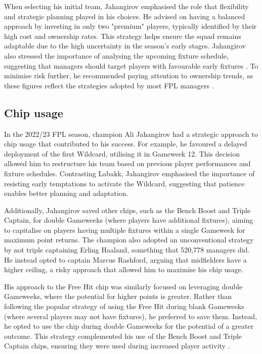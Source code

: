 When selecting his initial team, Jahangirov emphasised the role that flexibility and strategic planning played in his choices. He advised on having a balanced approach by investing in only two "premium" players, typically identified by their high cost and ownership rates. This strategy helps ensure the squad remains adaptable due to the high uncertainty in the season's early stages. Jahangirov also stressed the importance of analysing the upcoming fixture schedule, suggesting that managers should target players with favourable early fixtures \cite{fpl_jahangirov2023}. To minimise risk further, he recommended paying attention to ownership trends, as these figures reflect the strategies adopted by most FPL managers \cite{fpl_jahangirov2023_budget}.

\subsection{Chip usage}

In the 2022/23 FPL season, champion Ali Jahangirov had a strategic approach to chip usage that contributed to his success. For example, he favoured a delayed deployment of the first Wildcard, utilising it in Gameweek 12. This decision allowed him to restructure his team based on previous player performances and fixture schedules. Contrasting Labakk, Jahangirov emphasised the importance of resisting early temptations to activate the Wildcard, suggesting that patience enables better planning and adaptation.

Additionally, Jahangirov saved other chips, such as the Bench Boost and Triple Captain, for double Gameweeks (where players have additional fixtures), aiming to capitalise on players having multiple fixtures within a single Gameweek for maximum point returns. The champion also adopted an unconventional strategy by not triple captaining Erling Haaland, something that 520,778 managers did. He instead opted to captain Marcus Rashford, arguing that midfielders have a higher ceiling, a risky approach that allowed him to maximise his chip usage.

His approach to the Free Hit chip was similarly focused on leveraging double Gameweeks, where the potential for higher points is greater. Rather than following the popular strategy of using the Free Hit during blank Gameweeks (where several players may not have fixtures), he preferred to save them. Instead, he opted to use the chip during double Gameweeks for the potential of a greater outcome. This strategy complemented his use of the Bench Boost and Triple Captain chips, ensuring they were used during increased player activity \cite{fpl_jahangirov2023_chips}.

